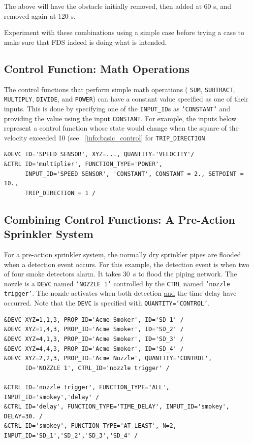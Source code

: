\documentclass[11pt]{book}
\newcommand{\ct}{\tt\small}
\begin{document}
\normalsize
\noindent
The above will have the obstacle initially removed, then added at 60 s, and removed again at 120 s.

Experiment with these combinations using a simple
case before trying a case to make sure that FDS indeed is doing what is intended.

\subsection{Control Function: Math Operations }
\label{info:CONTROL_MATH}

The control functions that perform simple math operations ( {\ct SUM},  {\ct SUBTRACT},  {\ct MULTIPLY},  {\ct DIVIDE}, and  {\ct POWER}) can have a constant value specified as one of their inputs.  This is done by specifying one of the {\ct INPUT\_ID}s as {\ct 'CONSTANT'} and providing the value using the input {\ct CONSTANT}. For example, the inputs below represent a control function whose state would change when the square of the velocity exceeded 10 (see ~\ref{info:basic_control} for {\ct TRIP\_DIRECTION}.

\footnotesize
\begin{verbatim}
&DEVC ID='SPEED SENSOR', XYZ=..., QUANTITY='VELOCITY'/
&CTRL ID='multiplier', FUNCTION_TYPE='POWER',
      INPUT_ID='SPEED SENSOR', 'CONSTANT', CONSTANT = 2., SETPOINT = 10.,
      TRIP_DIRECTION = 1 /
\end{verbatim}

\subsection{Combining Control Functions: A Pre-Action Sprinkler System}

For a pre-action sprinkler system, the normally
dry sprinkler pipes are flooded when a detection event occurs. For this example, the detection event is
when two of four smoke detectors alarm.  It takes 30~s to flood the piping network.
The nozzle is a {\ct DEVC} named {\ct 'NOZZLE 1'} controlled by the {\ct CTRL} named {\ct 'nozzle trigger'}.
The nozzle activates when both detection \underline{and} the time delay have occurred.  Note that the {\ct DEVC} is
specified with {\ct QUANTITY='CONTROL'}.

\footnotesize
\begin{verbatim}
&DEVC XYZ=1,1,3, PROP_ID='Acme Smoker', ID='SD_1' /
&DEVC XYZ=1,4,3, PROP_ID='Acme Smoker', ID='SD_2' /
&DEVC XYZ=4,1,3, PROP_ID='Acme Smoker', ID='SD_3' /
&DEVC XYZ=4,4,3, PROP_ID='Acme Smoker', ID='SD_4' /
&DEVC XYZ=2,2,3, PROP_ID='Acme Nozzle', QUANTITY='CONTROL',
      ID='NOZZLE 1', CTRL_ID='nozzle trigger' /

&CTRL ID='nozzle trigger', FUNCTION_TYPE='ALL', INPUT_ID='smokey','delay' /
&CTRL ID='delay', FUNCTION_TYPE='TIME_DELAY', INPUT_ID='smokey', DELAY=30. /
&CTRL ID='smokey', FUNCTION_TYPE='AT_LEAST', N=2, INPUT_ID='SD_1','SD_2','SD_3','SD_4' /
\end{verbatim}
\normalsize
\end{document}
